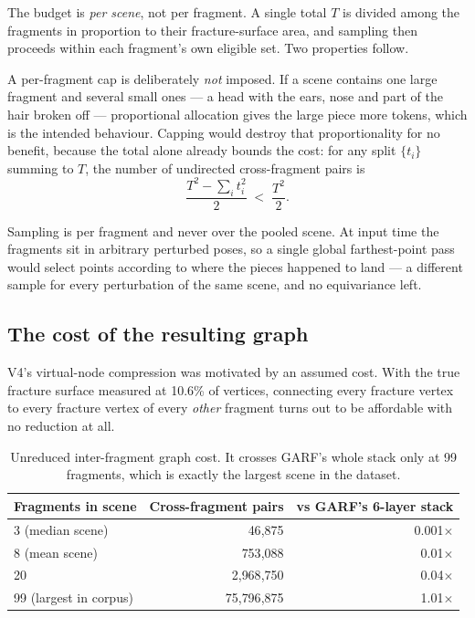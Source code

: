 \documentclass[11pt,a4paper]{report}
\begin{document}
The budget is \emph{per scene}, not per fragment. A single total $T$ is divided
among the fragments in proportion to their fracture-surface area, and sampling
then proceeds within each fragment's own eligible set. Two properties follow.

A per-fragment cap is deliberately \emph{not} imposed. If a scene contains one
large fragment and several small ones --- a head with the ears, nose and part of
the hair broken off --- proportional allocation gives the large piece more
tokens, which is the intended behaviour. Capping would destroy that
proportionality for no benefit, because the total alone already bounds the cost:
for any split $\{t_i\}$ summing to $T$, the number of undirected cross-fragment
pairs is
\[
\frac{T^2 - \sum_i t_i^2}{2} \;<\; \frac{T^2}{2}.
\]

Sampling is per fragment and never over the pooled scene. At input time the
fragments sit in arbitrary perturbed poses, so a single global farthest-point
pass would select points according to where the pieces happened to land --- a
different sample for every perturbation of the same scene, and no equivariance
left.

\subsection{The cost of the resulting graph}
\label{sub:graphcost}

V4's virtual-node compression was motivated by an assumed cost. With the true
fracture surface measured at 10.6\% of vertices, connecting every fracture
vertex to every fracture vertex of every \emph{other} fragment turns out to be
affordable with no reduction at all.

\begin{table}[h]
\centering
\small
\begin{tabular}{lrr}
\toprule
\textbf{Fragments in scene} & \textbf{Cross-fragment pairs} & \textbf{vs GARF's 6-layer stack} \\
\midrule
3 (median scene) & 46{,}875 & 0.001$\times$ \\
8 (mean scene) & 753{,}088 & 0.01$\times$ \\
20 & 2{,}968{,}750 & 0.04$\times$ \\
99 (largest in corpus) & 75{,}796{,}875 & 1.01$\times$ \\
\bottomrule
\end{tabular}
\caption{Unreduced inter-fragment graph cost. It crosses GARF's whole stack only
at 99 fragments, which is exactly the largest scene in the dataset.}
\end{table}
\end{document}
